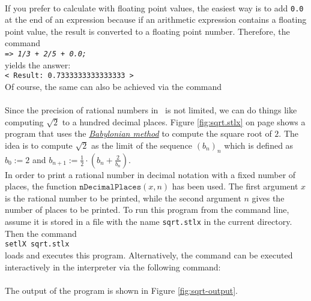 \\[0.2cm]
If you prefer to calculate with floating point values, the easiest way is to add
\texttt{0.0} at the end of an expression because if an arithmetic expression 
contains a floating point value, the result is converted to a floating point number.
Therefore, the command
\\[0.2cm]
\hspace*{1.3cm}
\texttt{=> \textsl{1/3 + 2/5 + 0.0;}}
\\[0.2cm]
yields the answer:
\\[0.2cm]
\hspace*{1.3cm}
\texttt{< Result: 0.7333333333333333 >}
\\[0.2cm]
Of course, the same can also be achieved via the command
\\[0.2cm]
\hspace*{1.3cm}
\\[0.2cm]
Since the precision of rational numbers in \setlx\ is not limited, we can do things like computing
$\sqrt{2}$ to a hundred decimal places.  Figure \ref{fig:sqrt.stlx} on page \pageref{fig:sqrt.stlx}
shows a program that uses the 
\href{http://en.wikipedia.org/wiki/Methods_of_computing_square_roots#Babylonian_method}{\emph{Babylonian method}}
to compute the square root of $2$.  The idea is to compute $\sqrt{2}$ as the limit of the sequence $(b_n)_n$ which is defined as
\\[0.2cm]
\hspace*{1.3cm}
$b_0 := 2$ \quad and \quad $\displaystyle b_{n+1} := \frac{1}{2} \cdot \left(b_n + \frac{2}{b_n}\right)$.
\\[0.2cm]
In order to print a rational number in decimal notation with a fixed number of places, the function
$\texttt{nDecimalPlaces}(x,n)$ has been used.  The first argument $x$ is the rational number to be
printed, while the second argument $n$ gives the number of places to be printed.  To run this
program from the command line, assume it is stored in a file with the name \texttt{sqrt.stlx} in the
current directory.  Then the command
\\[0.2cm]
\hspace*{1.3cm}
\texttt{setlX sqrt.stlx}
\\[0.2cm]
loads and executes this program.  Alternatively, the command can be executed interactively in the
interpreter via the following command:
\\[0.2cm]
\hspace*{1.3cm}
\\[0.2cm]
The output of the program is shown in Figure \ref{fig:sqrt-output}.

